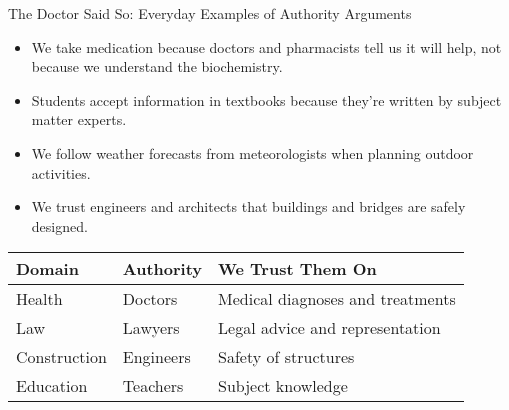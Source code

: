 \documentclass{beamer}
\begin{document}
\begin{frame}{The Doctor Said So: Everyday Examples of Authority Arguments}
    \begin{itemize}
        \item We take medication because doctors and pharmacists tell us it will help, not because we understand the biochemistry.
        \item Students accept information in textbooks because they're written by subject matter experts.
        \item We follow weather forecasts from meteorologists when planning outdoor activities.
        \item We trust engineers and architects that buildings and bridges are safely designed.
    \end{itemize}
    
    \begin{table}
        \begin{tabular}{|l|l|l|}
            \hline
            \textbf{Domain} & \textbf{Authority} & \textbf{We Trust Them On} \\
            \hline
            Health & Doctors & Medical diagnoses and treatments \\
            Law & Lawyers & Legal advice and representation \\
            Construction & Engineers & Safety of structures \\
            Education & Teachers & Subject knowledge \\
            \hline
        \end{tabular}
    \end{table}
\end{frame}
\end{document}
